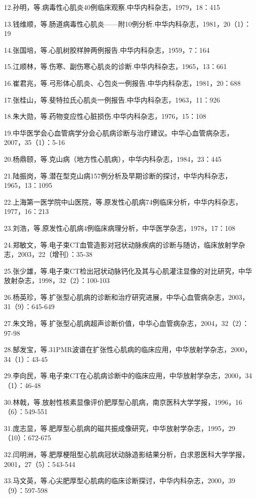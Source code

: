 12.孙明，等.病毒性心肌炎40例临床观察.中华内科杂志，1979，18：415

13.钱维顺，等.肠道病毒性心肌炎------附10例分析.中华内科杂志，1981，20（1）：19

14.张国培，等.心肌树胶样肿两例报告.中华内科杂志，1959，7：164

15.江顺林，等.伤寒、副伤寒心肌炎的诊断.中华内科杂志，1965，13：661

16.崔君兆，等.弓形体心肌炎、心包炎一例报告.中华内科杂志，1981，20：688

17.张桂山，等.斐特拉氏心肌炎一例报告.中华内科杂志，1963，11：926

18.朱大勋，等.药物变应性心脏损伤.中华内科杂志，1976，15：108

19.中华医学会心血管病学分会心肌病诊断与治疗建议。中华心血管病杂志，2007，35（1）：5-16

20.杨鼎颐，等.克山病（地方性心肌病），中华内科杂志，1984，23：445

21.陆振岗，等.潜在型克山病157例分析及早期诊断的探讨，中华内科杂志，1965，13：1095

22.上海第一医学院中山医院，等.原发性心肌病74例临床分析，中华内科杂志，1977，16：213

23.刘浩，等.原发性心肌病4例临床病理分析，中华医学杂志，1978，17：108

24.郑敏文，等.电子束CT血管造影对冠状动脉疾病的诊断与随访，临床放射学杂志，2003，22（增刊）：35-38

25.张少雄，等.电子束CT检出冠状动脉钙化及其与心肌灌注显像的对比研究，中华放射杂志，1998，32（2）：100-103

26.杨英珍，等.扩张型心肌病的诊断和治疗研究进展，中华心血管病杂志，2003，31（9）：645-649

27.朱文玲，等.扩张型心肌病超声诊断价值，中华心血管病杂志，2004，32（2）：97-98

28.郜发宝，等.31PMR波谱在扩张性心肌病的临床应用，中华放射学杂志，2000，34（1）：43-45

29.李向民，等.电子束CT在心肌病诊断中的临床应用，中华放射学杂志，2000，34（1）：46-48

30.林戟，等.放射性核素显像评价肥厚型心肌病，南京医科大学学报，1996，16（6）：549-551

31.庞志显，等.肥厚型心肌病的磁共振成像研究，中华放射学杂志，1995，29（10）：672-675

32.闫明洲，等.肥厚梗阻型心肌病冠状动脉造影结果分析，白求恩医科大学学报，2001，27（5）：543-544

33.马文英，等.心尖肥厚型心肌病的临床诊断探讨，中华内科杂志，2000，39（9）：597-598

